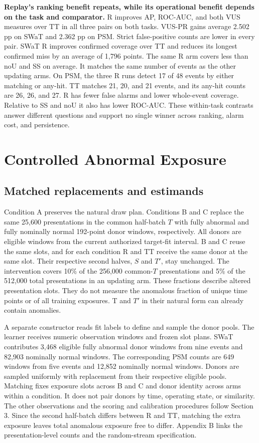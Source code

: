\documentclass[
  american,
]{article}
\begin{document}
\textbf{Replay's ranking benefit repeats, while its operational benefit
depends on the task and comparator.} R improves AP, ROC-AUC, and both
VUS measures over TT in all three pairs on both tasks. VUS-PR gains
average 2.502 pp on SWaT and 2.362 pp on PSM. Strict false-positive
counts are lower in every pair. SWaT R improves confirmed coverage over
TT and reduces its longest confirmed miss by an average of 1,796 points.
The same R arm covers less than noU and SS on average. It matches the
same number of events as the other updating arms. On PSM, the three R
runs detect 17 of 48 events by either matching or any-hit. TT matches
21, 20, and 21 events, and its any-hit counts are 26, 26, and 27. R has
fewer false alarms and lower whole-event coverage. Relative to SS and
noU it also has lower ROC-AUC. These within-task contrasts answer
different questions and support no single winner across ranking, alarm
cost, and persistence.

\section{Controlled Abnormal
Exposure}\label{controlled-abnormal-exposure}

\subsection{Matched replacements and
estimands}\label{matched-replacements-and-estimands}

Condition A preserves the natural draw plan. Conditions B and C replace
the same 25,600 presentations in the common half-batch \(T\) with fully
abnormal and fully nominally normal 192-point donor windows,
respectively. All donors are eligible windows from the current
authorized target-fit interval. B and C reuse the same slots, and for
each condition R and TT receive the same donor at the same slot. Their
respective second halves, \(S\) and \(T'\), stay unchanged. The
intervention covers 10\% of the 256,000 common-\(T\) presentations and
5\% of the 512,000 total presentations in an updating arm. These
fractions describe altered presentation slots. They do not measure the
anomalous fraction of unique time points or of all training exposures. T
and \(T'\) in their natural form can already contain anomalies.

A separate constructor reads fit labels to define and sample the donor
pools. The learner receives numeric observation windows and frozen slot
plans. SWaT contributes 3,468 eligible fully abnormal donor windows from
nine events and 82,903 nominally normal windows. The corresponding PSM
counts are 649 windows from five events and 12,852 nominally normal
windows. Donors are sampled uniformly with replacement from their
respective eligible pools. Matching fixes exposure slots across B and C
and donor identity across arms within a condition. It does not pair
donors by time, operating state, or similarity. The other observations
and the scoring and calibration procedures follow Section 3. Since the
second half-batch differs between R and TT, matching the extra exposure
leaves total anomalous exposure free to differ. Appendix B links the
presentation-level counts and the random-stream specification.
\end{document}
